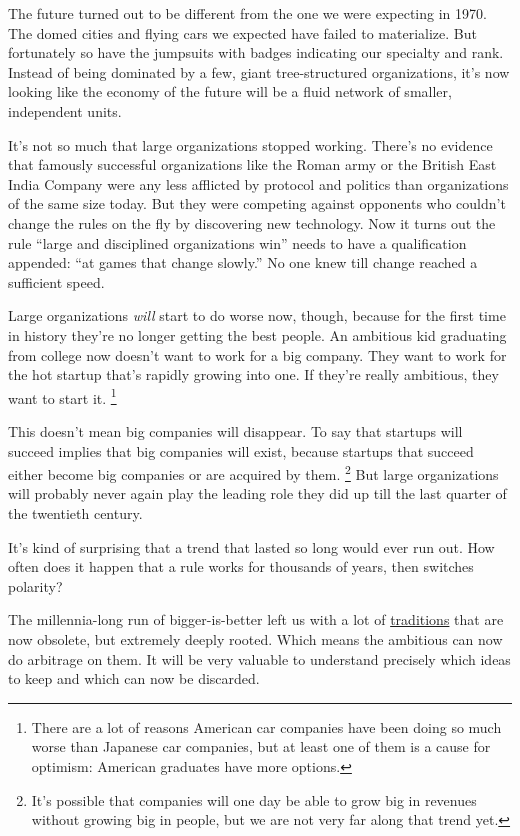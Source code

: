 \documentclass[12pt]{book}
\begin{document}
The future turned out to be different from the one we were expecting in
1970. The domed cities and flying cars we expected have failed to
materialize. But fortunately so have the jumpsuits with badges
indicating our specialty and rank. Instead of being dominated by a few,
giant tree-structured organizations, it's now looking like the economy
of the future will be a fluid network of smaller, independent units.

It's not so much that large organizations stopped working. There's no
evidence that famously successful organizations like the Roman army or
the British East India Company were any less afflicted by protocol and
politics than organizations of the same size today. But they were
competing against opponents who couldn't change the rules on the fly by
discovering new technology. Now it turns out the rule ``large and
disciplined organizations win'' needs to have a qualification appended:
``at games that change slowly.'' No one knew till change reached a
sufficient speed.

Large organizations \emph{will} start to do worse now, though, because
for the first time in history they're no longer getting the best people.
An ambitious kid graduating from college now doesn't want to work for a
big company. They want to work for the hot startup that's rapidly
growing into one. If they're really ambitious, they want to start it.
\footnote{There are a lot of reasons American car companies have been
doing so much worse than Japanese car companies, but at least one of
them is a cause for optimism: American graduates have more options.}

This doesn't mean big companies will disappear. To say that startups
will succeed implies that big companies will exist, because startups
that succeed either become big companies or are acquired by them.
\footnote{It's possible that companies will one day be able to grow big in
revenues without growing big in people, but we are not very far along
that trend yet.} But large organizations will probably never
again play the leading role they did up till the last quarter of the
twentieth century.

It's kind of surprising that a trend that lasted so long would ever run
out. How often does it happen that a rule works for thousands of years,
then switches polarity?

The millennia-long run of bigger-is-better left us with a lot of
\href{credentials.html}{traditions} that are now obsolete, but extremely
deeply rooted. Which means the ambitious can now do arbitrage on them.
It will be very valuable to understand precisely which ideas to keep and
which can now be discarded.
\end{document}
